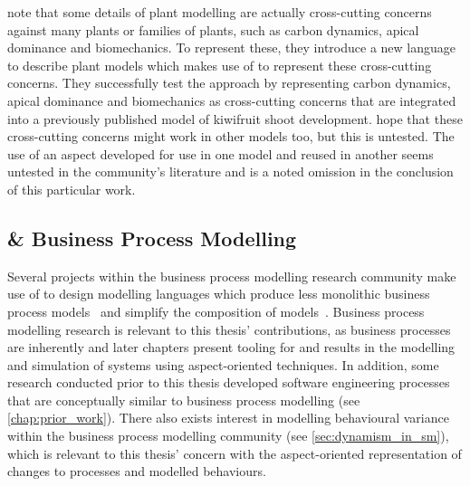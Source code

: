 \citeauthor{Cieslak_2011} note that some details of plant modelling are actually
cross-cutting concerns against many plants or families of plants, such as carbon
dynamics, apical dominance and biomechanics. To represent these, they introduce
a new language to describe plant models which makes use of \aspectorientation{} to
represent these cross-cutting concerns. They successfully test the approach by
representing carbon dynamics, apical dominance and biomechanics as cross-cutting
concerns that are integrated into a previously published model of kiwifruit
shoot development. \citeauthor{Cieslak_2011} hope that these cross-cutting
concerns might work in other models too, but this is untested. The use of an
aspect developed for use in one model and reused in another seems untested in
the community's literature and is a
noted omission in the conclusion of this particular work.







\subsection{\AspectOrientation{} \& Business Process Modelling}\label{subsec:ao_and_bpm_review}



Several projects within the business process modelling research community make
use of \aspectorientation{} to design modelling languages which produce less
monolithic business process models~\cite{Cappelli_AOBPM,da2020implementation}
and simplify the composition of models~\cite{charfi2007ao4bpel}. Business
process modelling research is relevant to this thesis' contributions, as
business processes are inherently \sociotechnical and later chapters present
tooling for and results in the modelling and simulation of \sociotechnical
systems using aspect-oriented techniques. In addition, some research conducted
prior to this thesis developed software engineering processes that are
conceptually similar to business process modelling (see \cref{chap:prior_work}).
There also exists interest in modelling behavioural variance within the business
process modelling community (see \cref{sec:dynamism_in_sm}), which is relevant
to this thesis' concern with the aspect-oriented representation of changes to
processes and modelled behaviours.

